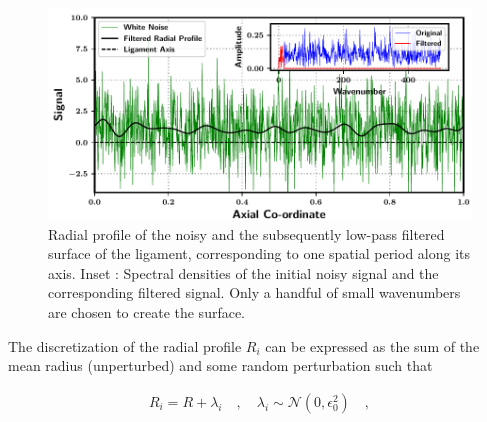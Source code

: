 \begin{figure}
\centering
\includegraphics{plots/ligament_breakup/profile.pdf}
	\caption{ Radial profile of the noisy and the subsequently 
	low-pass filtered surface of the ligament, corresponding to 
	one spatial period along its axis. 
	Inset : Spectral densities of the initial noisy signal
        and the corresponding filtered signal. Only a handful
	of small wavenumbers are chosen to create the surface. 
}
\label{surface}
\end{figure}

The discretization of the radial profile $R_i$ can be expressed as the sum of the mean radius 
(unperturbed) and some random perturbation such that    

\begin{align}
	R_i = R + \lambda_i \quad , \quad \lambda_i \sim \mathcal{N}(0,\epsilon_{0}^2) \quad , 
\end{align}

